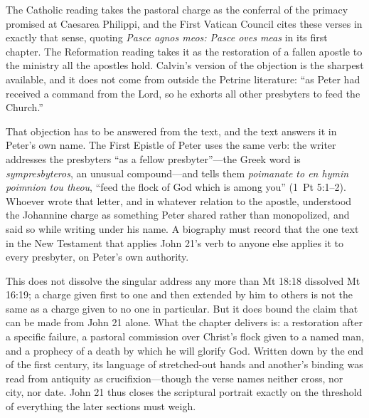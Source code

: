 The Catholic reading takes the pastoral charge as the conferral of the
primacy promised at Caesarea Philippi, and the First Vatican Council cites
these verses in exactly that sense, quoting \textit{Pasce agnos meos: Pasce
oves meas} in its first chapter. The Reformation reading takes it as the
restoration of a fallen apostle to the ministry all the apostles hold.
Calvin's version of the objection is the sharpest available, and it does not
come from outside the Petrine literature: ``as Peter had received a command
from the Lord, so he exhorts all other presbyters to feed the Church.''

That objection has to be answered from the text, and the text answers it in
Peter's own name. The First Epistle of Peter uses the same verb: the writer
addresses the presbyters ``as a fellow presbyter''---the Greek word is
\textit{sympresbyteros}, an unusual compound---and tells them
\textit{poimanate to en hymin poimnion tou theou}, ``feed the flock of God
which is among you'' (1~Pt 5:1--2). Whoever wrote that letter, and in
whatever relation to the apostle, understood the Johannine charge as
something Peter shared rather than monopolized, and said so while writing
under his name. A biography must record that the one text in the New
Testament that applies John 21's verb to anyone else applies it to every
presbyter, on Peter's own authority.

This does not dissolve the singular address any more than Mt 18:18 dissolved
Mt 16:19; a charge given first to one and then extended by him to others is
not the same as a charge given to no one in particular. But it does bound the
claim that can be made from John 21 alone. What the chapter delivers is: a
restoration after a specific failure, a pastoral commission over Christ's
flock given to a named man, and a prophecy of a death by which he will
glorify God. Written down by the end of the first century, its language of
stretched-out hands and another's binding was read from antiquity as
crucifixion---though the verse names neither cross, nor city, nor date.
John 21 thus closes the scriptural portrait exactly on the threshold of
everything the later sections must weigh.
